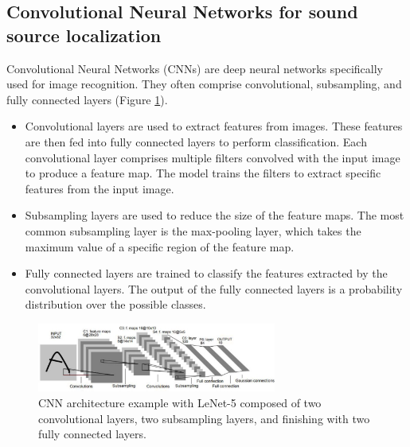\subsection{Convolutional Neural Networks for sound source localization}
\label{sec:cnn_for_ssl}

Convolutional Neural Networks (CNNs)\cite{oshea2015introduction} are deep neural networks specifically used for image recognition. They often comprise convolutional, subsampling, and fully connected layers (Figure \ref*{fig:cnn_example}).
\begin{itemize}
    \item{} Convolutional layers are used to extract features from images. These features are then fed into fully connected layers to perform classification. Each convolutional layer comprises multiple filters convolved with the input image to produce a feature map. The model trains the filters to extract specific features from the input image.
    \item{} Subsampling layers are used to reduce the size of the feature maps. The most common subsampling layer is the max-pooling layer, which takes the maximum value of a specific region of the feature map.
    \item{} Fully connected layers are trained to classify the features extracted by the convolutional layers. The output of the fully connected layers is a probability distribution over the possible classes. 
\end{itemize}

\begin{figure}[H]
    \centering
    \includegraphics[width=0.7\textwidth]{../Images/cnn_example.png}
    \caption{CNN architecture example with LeNet-5 \protect\cite{726791} composed of two convolutional layers, two subsampling layers, and finishing with two fully connected layers.}
    \label{fig:cnn_example}
\end{figure}

